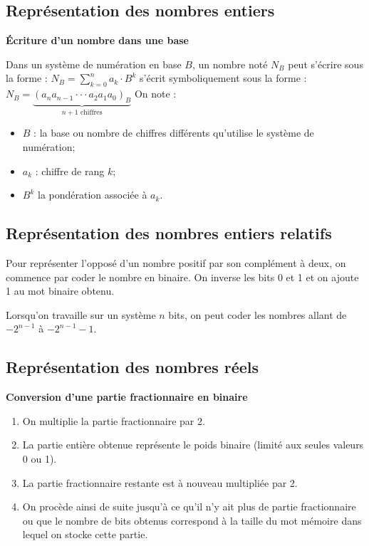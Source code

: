 \documentclass[10pt,fleqn]{article} %
\begin{document}

\vspace{2cm}
\pagestyle{fancy}
\thispagestyle{plain}

\subsection*{Représentation des nombres entiers}
\begin{defi}\textbf{Écriture d'un nombre dans une base}

Dans un système de numération en base $B$, un nombre noté $N_B$ peut s'écrire sous la forme : $N_B = \sum\limits_{k=0}^{n} a_k \cdot B^k $
s'écrit symboliquement sous la forme : 
$
N_B = \underbrace{\left(a_n a_{n-1} \cdot \cdot \cdot a_2 a_1 a_0\right)_B}_{n+1 \text{ chiffres}}
$
On note : 
\begin{itemize}
\item $B$ : la base ou nombre de chiffres différents qu'utilise le système de numération;
\item $a_k$ : chiffre de rang $k$;
\item $B^k$ la pondération associée à $a_k$.
\end{itemize}

\end{defi}

\subsection*{Représentation des nombres entiers relatifs}

\begin{methode} 
Pour représenter l’opposé d’un nombre positif par son complément à deux, on commence par coder le nombre en binaire. On inverse les bits 0 et 1 et on ajoute 1 au mot binaire obtenu.
\end{methode}
\begin{rem}
Lorsqu'on travaille sur un système $n$ bits, on peut coder les nombres allant de $-2^{n-1}$ à $-2^{n-1}-1$.
\end{rem}

\subsection*{Représentation des nombres réels}
\begin{methode}
\textbf{Conversion d'une partie fractionnaire en binaire}

\begin{enumerate}
\item On multiplie la partie fractionnaire par 2. 
\item La partie entière obtenue représente le poids binaire (limité aux seules valeurs 0 ou 1). 
\item La partie fractionnaire restante est à nouveau multipliée par 2.
\item On procède ainsi de suite jusqu’à ce qu’il n’y ait plus de partie fractionnaire ou que le nombre de bits obtenus correspond à la taille du mot mémoire dans lequel on stocke cette partie.
\end{enumerate}
\end{methode}
\end{document}
